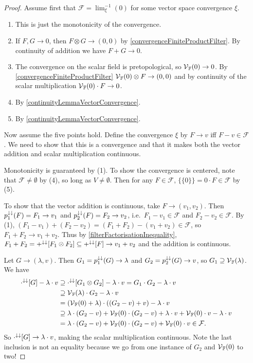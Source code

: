 \begin{proof}
Assume first that $\mathcal{F} = \lim^{-1}_\xi(0)$ for some vector space convergence $\xi$.
\begin{enumerate}
\item This is just the monotonicity of the convergence.
\item If $F,G\to 0$, then $F\otimes G \to (0,0)$ by \ref{convergenceFiniteProductFilter}. By continuity of addition we have $F+G\to 0$.
\item The convergence on the scalar field is pretopological, so $\operatorname{\mathcal{V}}_{\mathbb{F}}(0)\to 0$. By \ref{convergenceFiniteProductFilter} $\operatorname{\mathcal{V}}_{\mathbb{F}}(0)\otimes F \to (0,0)$ and by continuity of the scalar multiplication $\operatorname{\mathcal{V}}_{\mathbb{F}}(0)\cdot F \to 0$.
\item By \ref{continuityLemmaVectorConvergence}.
\item By \ref{continuityLemmaVectorConvergence}.
\end{enumerate}

Now assume the five points hold. Define the convergence $\xi$ by $F\to v$ iff $F-v \in \mathcal{F}$. We need to show that this is a convergence and that it makes both the vector addition and scalar multiplication continuous.

Monotonicity is guaranteed by (1). To show the convergence is centered, note that $\mathcal{F} \neq \emptyset$ by (4), so long as $V\neq \emptyset$. Then for any $F\in \mathcal{F}$, $\big\{\{0\}\big\} = 0\cdot F \in \mathcal{F}$ by (5).

To show that the vector addition is continuous, take $F\to (v_1, v_2)$. Then $p_1^{\downarrow\downarrow}(F) = F_1\to v_1$ and $p_2^{\downarrow\downarrow}(F) = F_2 \to v_2$, i.e.\ $F_1-v_1 \in \mathcal{F}$ and $F_2-v_2 \in \mathcal{F}$. By (1), $(F_1-v_1) + (F_2-v_2) = (F_1+F_2) - (v_1 + v_2) \in \mathcal{F}$, so $F_1+F_2 \to v_1 + v_2$. Thus by \ref{filterFactorisationInequality}, $F_1+F_2 = +^{\downarrow\downarrow}[F_1\otimes F_2] \subseteq +^{\downarrow\downarrow}[F] \to v_1+v_2$ and the addition is continuous.

Let $G \to (\lambda, v)$. Then $G_1 = p_1^{\downarrow\downarrow}(G) \to \lambda$ and $G_2 = p_2^{\downarrow\downarrow}(G) \to v$, so $G_1 \supseteq \operatorname{\mathcal{V}}_{\mathbb{F}}(\lambda)$. We have
\begin{align*}
\cdot^{\downarrow\downarrow}[G] - \lambda\cdot v &\supseteq \cdot^{\downarrow\downarrow}[G_1\otimes G_2] - \lambda\cdot v = G_1\cdot G_2 - \lambda\cdot v \\
&\supseteq \operatorname{\mathcal{V}}_{\mathbb{F}}(\lambda) \cdot G_2 - \lambda\cdot v \\
&= (\operatorname{\mathcal{V}}_{\mathbb{F}}(0) + \lambda)\cdot((G_2 - v) + v) - \lambda\cdot v \\
&\supseteq \lambda\cdot (G_2 - v) + \operatorname{\mathcal{V}}_{\mathbb{F}}(0)\cdot(G_2-v) + \lambda\cdot v + \operatorname{\mathcal{V}}_{\mathbb{F}}(0)\cdot v - \lambda\cdot v \\
&= \lambda\cdot (G_2 - v) + \operatorname{\mathcal{V}}_{\mathbb{F}}(0)\cdot(G_2-v) + \operatorname{\mathcal{V}}_{\mathbb{F}}(0)\cdot v \in \mathcal{F}.
\end{align*}
So $\cdot^{\downarrow\downarrow}[G] \to \lambda\cdot v$, making the scalar multiplication continuous. Note the last inclusion is not an equality because we go from one instance of $G_2$ and $\operatorname{\mathcal{V}}_{\mathbb{F}}(0)$ to two!
\end{proof}

